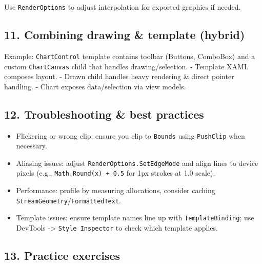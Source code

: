 Use \passthrough{\lstinline!RenderOptions!} to adjust interpolation for
exported graphics if needed.

\subsection{11. Combining drawing \& template
(hybrid)}\label{combining-drawing-template-hybrid}

Example: \passthrough{\lstinline!ChartControl!} template contains
toolbar (Buttons, ComboBox) and a custom
\passthrough{\lstinline!ChartCanvas!} child that handles
drawing/selection. - Template XAML composes layout. - Drawn child
handles heavy rendering \& direct pointer handling. - Chart exposes
data/selection via view models.

\subsection{12. Troubleshooting \& best
practices}\label{troubleshooting-best-practices}

\begin{itemize}
\tightlist
\item
  Flickering or wrong clip: ensure you clip to
  \passthrough{\lstinline!Bounds!} using
  \passthrough{\lstinline!PushClip!} when necessary.
\item
  Aliasing issues: adjust
  \passthrough{\lstinline!RenderOptions.SetEdgeMode!} and align lines to
  device pixels (e.g., \passthrough{\lstinline!Math.Round(x) + 0.5!} for
  1px strokes at 1.0 scale).
\item
  Performance: profile by measuring allocations, consider caching
  \passthrough{\lstinline!StreamGeometry!}/\passthrough{\lstinline!FormattedText!}.
\item
  Template issues: ensure template names line up with
  \passthrough{\lstinline!TemplateBinding!}; use DevTools
  -\textgreater{} \passthrough{\lstinline!Style Inspector!} to check
  which template applies.
\end{itemize}

\subsection{13. Practice exercises}\label{practice-exercises-17}

